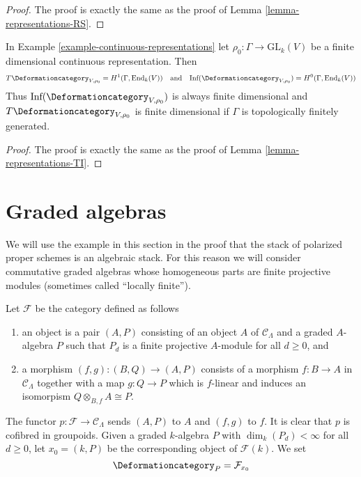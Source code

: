 \begin{proof}
The proof is exactly the same as the proof of
Lemma \ref{lemma-representations-RS}.
\end{proof}

\begin{lemma}
\label{lemma-continuous-representations-TI}
In Example \ref{example-continuous-representations} let
$\rho_0 : \Gamma \to \text{GL}_k(V)$ be a finite dimensional
continuous representation. Then
$$
T\Deformationcategory_{V, \rho_0} = H^1(\Gamma, \text{End}_k(V))
\quad\text{and}\quad
\text{Inf}(\Deformationcategory_{V, \rho_0}) = H^0(\Gamma, \text{End}_k(V))
$$
Thus $\text{Inf}(\Deformationcategory_{V, \rho_0})$
is always finite dimensional
and $T\Deformationcategory_{V, \rho_0}$ is finite dimensional
if $\Gamma$ is topologically finitely generated.
\end{lemma}

\begin{proof}
The proof is exactly the same as the proof of
Lemma \ref{lemma-representations-TI}.
\end{proof}



\section{Graded algebras}
\label{section-graded-algebras}

\noindent
We will use the example in this section in the proof that the stack of
polarized proper schemes is an algebraic stack. For this reason we will
consider commutative graded algebras whose homogeneous parts are
finite projective modules (sometimes called ``locally finite'').

\begin{example}
\label{example-graded-algebras}
Let $\mathcal{F}$ be the category defined as follows
\begin{enumerate}
\item an object is a pair $(A, P)$ consisting of an
object $A$ of $\mathcal{C}_\Lambda$ and a graded $A$-algebra $P$
such that $P_d$ is a finite projective $A$-module for all $d \geq 0$, and
\item a morphism $(f, g) : (B, Q) \to (A, P)$ consists of
a morphism $f : B \to A$ in $\mathcal{C}_\Lambda$ together
with a map $g : Q \to P$ which is $f$-linear and induces an
isomorpism $Q \otimes_{B, f} A \cong P$.
\end{enumerate}
The functor $p : \mathcal{F} \to \mathcal{C}_\Lambda$ sends $(A, P)$
to $A$ and $(f, g)$ to $f$. It is clear that $p$ is cofibred in groupoids.
Given a graded $k$-algebra $P$ with $\dim_k(P_d) < \infty$ for all
$d \geq 0$, let $x_0 = (k, P)$ be the corresponding object of $\mathcal{F}(k)$.
We set
$$
\Deformationcategory_P = \mathcal{F}_{x_0}
$$
\end{example}

